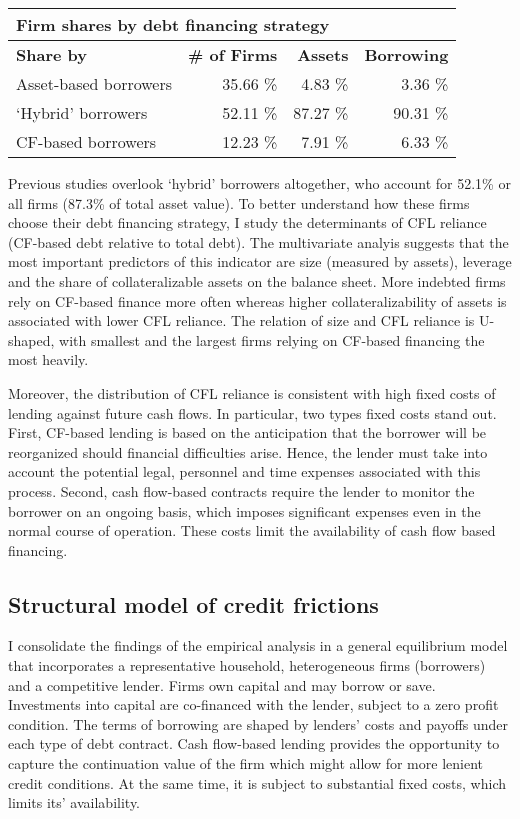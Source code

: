 \documentclass[12pt]{article}
\begin{document}
\begin{table}[h!]
\centering
\begin{tabular}{l|rrr}
\multicolumn{4}{l}{\textbf{Firm shares by debt financing strategy}} \\
\hline
\hspace{2.2cm} \textbf{Share by} & \textbf{\# of Firms} & \textbf{Assets}  & \textbf{Borrowing} \\  
Asset-based borrowers & 35.66 \% & 4.83 \% & 3.36 \% \\ 
`Hybrid' borrowers & 52.11 \% & 87.27 \% & 90.31  \% \\ 
CF-based borrowers & 12.23 \% & 7.91 \% & 6.33  \% \\ 
   \bottomrule
\end{tabular}
\label{tab:shares}
\end{table}

\noindent Previous studies overlook `hybrid' borrowers altogether, who account for 52.1\% or all firms (87.3\% of total asset value). To better understand how these firms choose their debt financing strategy, I study the determinants of CFL reliance (CF-based debt relative to total debt). The multivariate analyis suggests that the most important predictors of this indicator are size (measured by assets), leverage and the share of collateralizable assets on the balance sheet. More indebted firms rely on CF-based finance more often whereas higher collateralizability of assets is associated with lower CFL reliance. The relation of size and CFL reliance is U-shaped, with smallest and the largest firms relying on CF-based financing the most heavily.

Moreover, the distribution of CFL reliance is consistent with high fixed costs of lending against future cash flows. In particular, two types fixed costs stand out. First, CF-based lending is based on the anticipation that the borrower will be reorganized should financial difficulties arise. Hence, the lender must take into account the potential legal, personnel and time expenses associated with this process. Second, cash flow-based contracts require the lender to monitor the borrower on an ongoing basis, which imposes significant expenses even in the normal course of operation. These costs limit the availability of cash flow based financing.

\subsection*{Structural model of credit frictions}
I consolidate the findings of the empirical analysis in a general equilibrium model that incorporates a representative household, heterogeneous firms (borrowers) and a competitive lender. Firms own capital and may borrow or save. Investments into capital are co-financed with the lender, subject to a zero profit condition. The terms of borrowing are shaped by lenders' costs and payoffs under each type of debt contract. Cash flow-based lending provides the opportunity to capture the continuation value of the firm which might allow for more lenient credit conditions. At the same time, it is subject to substantial fixed costs, which limits its' availability.    
\end{document}
